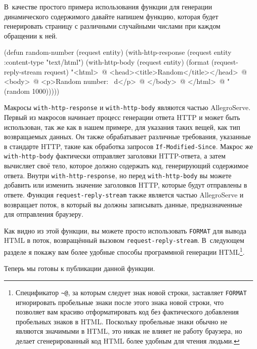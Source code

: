 В~качестве простого примера использования функции для генерации динамического
содержимого давайте напишем функцию, которая будет генерировать страницу с различными
случайными числами при каждом обращении к ней.

\begin{myverb}
(defun random-number (request entity)
  (with-http-response (request entity :content-type "text/html")
    (with-http-body (request entity)
      (format 
       (request-reply-stream request)
       "<html>~@
        <head><title>Random</title></head>~@
        <body>~@
        <p>Random number: ~d</p>~@
        </body>~@
        </html>~@
       "
       (random 1000)))))
\end{myverb}

Макросы \lstinline{with-http-response} и \lstinline{with-http-body} являются частью
AllegroServe. Первый из макросов начинает процесс генерации ответа HTTP и может быть
использован, так же как в нашем примере, для указания таких вещей, как тип возвращаемых
данных. Он также обрабатывает различные требования, указанные в стандарте HTTP, такие как
обработка запросов \lstinline{If-Modified-Since}. Макрос же \lstinline{with-http-body} фактически
отправляет заголовки HTTP-ответа, а затем вычисляет своё тело, которое должно содержать
код, генерирующий содержимое ответа. Внутри \lstinline{with-http-response}, но перед
\lstinline{with-http-body} вы можете добавить или изменить значение заголовков HTTP, которые
будут отправлены в ответе. Функция \lstinline{request-reply-stream} также является частью
AllegroServe и возвращает поток, в который вы должны записывать данные, предназначенные для
отправления браузеру.

Как видно из этой функции, вы можете просто использовать \lstinline{FORMAT} для вывода HTML в
поток, возвращённый вызовом \lstinline{request-reply-stream}. В~следующем разделе я покажу вам
более удобные способы программной генерации HTML\footnote{Спецификатор \lstinline{~@}, за
  которым следует знак новой строки, заставляет \lstinline{FORMAT} игнорировать пробельные
  знаки после этого знака новой строки, что позволяет вам красиво отформатировать код без
  фактического добавления пробельных знаков в HTML. Поскольку пробельные знаки обычно не
  являются значимыми в HTML, это никак не влияет не работу браузера, но делает
  сгенерированный код HTML более удобным для чтения людьми.}\hspace{\footnotenegspace}.

Теперь мы готовы к публикации данной функции.

